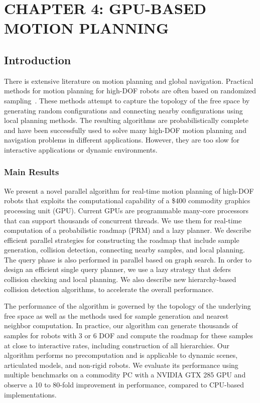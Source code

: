 \chapter[GPU-BASED MOTION PLANNING]{CHAPTER 4: GPU-BASED MOTION PLANNING} 
\label{chp:GPlanner}

\section{Introduction}
There is extensive literature on motion planning and global navigation. Practical methods for motion planning for high-DOF robots are often
based on randomized sampling~\cite{Kavraki96, Kuffner00}. These methods attempt to capture the topology of the free space
by generating random configurations and connecting nearby configurations using
local planning methods. The resulting algorithms are probabilistically complete and
have been successfully used to solve many high-DOF motion planning and
navigation problems in different applications. However, they are too slow for interactive applications or dynamic environments.


\subsection{Main Results}
We present a novel parallel algorithm
for real-time motion planning of high-DOF robots that exploits the computational capability of a \$400 commodity
graphics processing unit (GPU). Current GPUs are programmable many-core
processors that can support thousands of concurrent threads. We use
them for real-time computation of a probabilistic roadmap (PRM) and a lazy planner. We describe
efficient parallel strategies for constructing the roadmap that include
sample generation, collision detection, connecting nearby samples, and
local planning. The query phase is also performed in parallel based on graph search. In order to design an efficient single query planner, we use a lazy strategy that defers collision checking and local planning. We also describe new hierarchy-based collision detection algorithms, to accelerate the overall performance.

The performance of the algorithm is governed by the topology of the underlying
free space as well as the methods used for sample generation and nearest
neighbor computation. In practice, our algorithm can generate thousands of samples for
robots with 3 or 6 DOF and compute the roadmap for these samples at close to interactive rates, including construction of all hierarchies.
Our algorithm performs no precomputation and is applicable to dynamic scenes, articulated models, and non-rigid robots. We evaluate its
performance using multiple benchmarks on a commodity PC with a NVIDIA GTX 285 GPU and observe a 10 to 80-fold improvement in performance, compared to CPU-based implementations.

